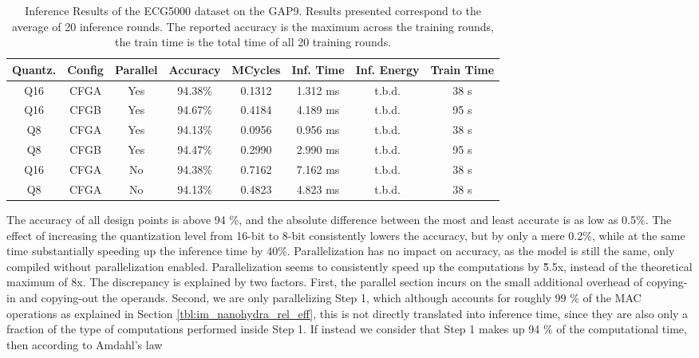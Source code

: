 \begin{table}[p!]
    \centerfloat
    \begin{tabular}{ c c c c c c c c}
    \toprule
    \textbf{Quantz.} & \textbf{Config} & \textbf{Parallel} & \textbf{Accuracy} & \textbf{MCycles} & \textbf{Inf. Time} & \textbf{Inf. Energy} & \textbf{Train Time} \\
    \midrule
    Q16 & CFGA & Yes & 94.38\% & 0.1312 & 1.312 ms & t.b.d. & 38 s\\
    Q16 & CFGB & Yes & 94.67\% & 0.4184 & 4.189 ms & t.b.d. & 95 s\\
    Q8  & CFGA & Yes & 94.13\% & 0.0956 & 0.956 ms & t.b.d. & 38 s\\
    Q8  & CFGB & Yes & 94.47\% & 0.2990 & 2.990 ms & t.b.d. & 95 s\\
    Q16 & CFGA & No  & 94.38\% & 0.7162 & 7.162 ms & t.b.d. & 38 s\\
    Q8  & CFGA & No  & 94.13\% & 0.4823 & 4.823 ms & t.b.d. & 38 s\\
    \bottomrule
    \end{tabular}
    \caption{Inference Results of the ECG5000 dataset on the GAP9. Results presented correspond to the average of 20 inference rounds. The reported accuracy is the maximum across the training rounds, the train time is the total time of all 20 training rounds.}%
    \label{tbl:gap9_inf_results}
\end{table}
The accuracy of all design points is above 94 \%, and the absolute difference between the most and least accurate is as low as 0.5\%. 
The effect of increasing the quantization level from 16-bit to 8-bit consistently lowers the accuracy, but by only a mere 0.2\%, while at the same time substantially speeding up the inference time by 40\%.
Parallelization has no impact on accuracy, as the model is still the same, only compiled without parallelization enabled. Parallelization seems to consistently speed up the computations by \~5.5x, instead of the theoretical maximum of 8x. 
The discrepancy is explained by two factors. First, the parallel section incurs on the small additional overhead of copying-in and copying-out the operands. Second, we are only parallelizing Step 1, which although accounts
for roughly 99 \% of the MAC operations as explained in Section \ref{tbl:im_nanohydra_rel_eff}, this is not directly translated into inference time, since they are also only a fraction of the type of computations performed inside Step 1.
If instead we consider that Step 1 makes up 94 \% of the computational time, then according to Amdahl's law 

